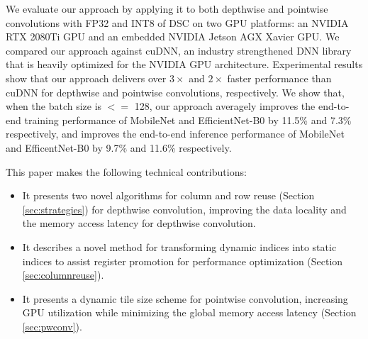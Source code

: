We evaluate our approach by applying it to both depthwise and pointwise convolutions with FP32 and INT8 of DSC on two GPU platforms: an NVIDIA RTX 2080Ti GPU
and an embedded NVIDIA Jetson AGX Xavier GPU. We compared our approach against cuDNN, an industry strengthened DNN library that is heavily
optimized for the NVIDIA GPU architecture. Experimental results show that our approach delivers over $3\times$ and $2\times$ faster
performance than cuDNN for depthwise and pointwise convolutions, respectively.
We show that, when the batch size is $<=$ 128, our approach averagely improves the end-to-end training performance of MobileNet \cite{Sandler_2018_CVPR,howard2019searching} and EfficientNet-B0 \cite{tan2019efficientnet} by 11.5\% and 7.3\% respectively, and improves the end-to-end inference performance of MobileNet and EfficentNet-B0 by 9.7\% and 11.6\% respectively.



This paper makes the following technical contributions:
\begin{itemize}
    \item It presents two novel algorithms for column and row reuse (Section \ref{sec:strategies}) for depthwise
        convolution, improving the data locality and the memory access latency for depthwise convolution.
    \item It describes a novel method for transforming dynamic indices into static indices to assist register promotion for performance
        optimization (Section \ref{sec:columnreuse}).
    \item It presents a dynamic tile size scheme for pointwise convolution, increasing GPU utilization while minimizing the global memory
        access latency (Section \ref{sec:pwconv}).
\end{itemize}

